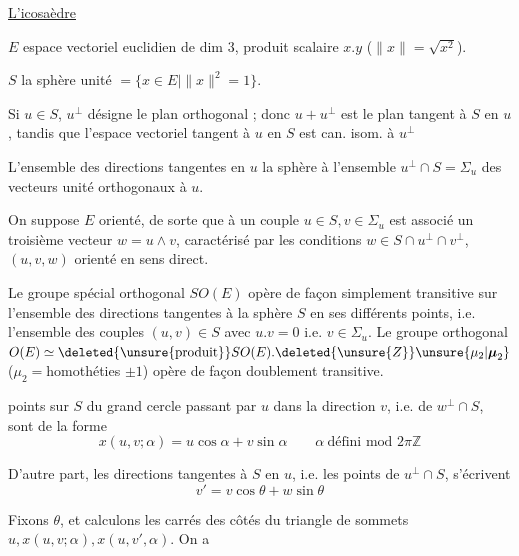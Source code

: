 \uline{L'icosaèdre}

$E$ espace vectoriel euclidien de dim $3$, produit scalaire $x.y$ ($\|x\|=\sqrt{x^2}$).

$S$ la sphère unité $=\{x\in E\mid\|x\|^2=1\}$.

Si $u\in S$, $u^\perp$ désigne le plan orthogonal ; donc $u+u^\perp$ est le plan tangent à $S$ en $u$, tandis que l'espace vectoriel tangent à $u$ en $S$ est can. isom. à $u^\perp$

L'ensemble des directions tangentes en $u$   la sphère   à l'ensemble $u^\perp\cap S=\Sigma_u$ des vecteurs unité orthogonaux à $u$.

On suppose $E$ orienté, de sorte que  à un couple $u\in S,v\in\Sigma_u$ est associé un troisième vecteur $w=u\wedge v$, caractérisé par les conditions $w\in S\cap u^\perp\cap v^\perp$, $(u,v,w)$ orienté en sens direct.

Le groupe spécial orthogonal $SO(E)$ opère de façon simplement transitive sur l'ensemble des directions tangentes à la sphère $S$ en ses différents points, i.e. l'ensemble des couples $(u,v)\in S$ avec $u.v=0$ i.e. $v\in\Sigma_u$. Le groupe orthogonal $O(E)\simeq\deleted{\text{\unsure{produit}}}SO(E).\deleted{\unsure{Z}}\unsure{\mu_2|\boldsymbol{\mu}_2}$ ($\mu_2={}$homothéties $\pm1$) opère de façon doublement transitive.

  points sur $S$ du grand cercle passant par $u$ dans la direction $v$,  i.e. de $w^\perp\cap S$, sont de la forme
\[
x(u,v;\alpha)=u\cos\alpha+v\sin\alpha \qquad \alpha\ \text{défini mod }2\pi\mathbb Z
\]

D'autre part, les  directions tangentes à $S$ en $u$, i.e. les  points de $u^\perp\cap S$, s'écrivent
\[
v'=v\cos\theta+w\sin\theta
\]

Fixons $\theta$, et calculons les carrés des côtés du triangle de sommets $u,x(u,v;\alpha),x(u,v',\alpha)$. On a

